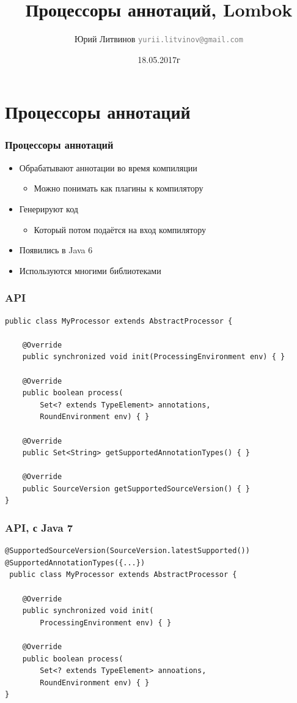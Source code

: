 \documentclass[xetex,mathserif,serif]{beamer}
\title{Процессоры аннотаций, Lombok}
\author[Юрий Литвинов]{Юрий Литвинов \newline \textcolor{gray}{\small\texttt{yurii.litvinov@gmail.com}}}
\date{18.05.2017г}
\begin{document}
	
	\frame{\titlepage}
	
	\section{Процессоры аннотаций}

	\begin{frame}
		\frametitle{Процессоры аннотаций}
		\begin{itemize}
			\item Обрабатывают аннотации во время компиляции
			\begin{itemize}
				\item Можно понимать как плагины к компилятору
			\end{itemize}
			\item Генерируют код
			\begin{itemize}
				\item Который потом подаётся на вход компилятору
			\end{itemize}
			\item Появились в Java 6
			\item Используются многими библиотеками
		\end{itemize}
	\end{frame}

	\begin{frame}[fragile]
		\frametitle{API}
		\begin{small}
			\begin{verbatim}
public class MyProcessor extends AbstractProcessor {

    @Override
    public synchronized void init(ProcessingEnvironment env) { }

    @Override
    public boolean process(
        Set<? extends TypeElement> annotations, 
        RoundEnvironment env) { }

    @Override
    public Set<String> getSupportedAnnotationTypes() { }

    @Override
    public SourceVersion getSupportedSourceVersion() { }
}
			\end{verbatim}
		\end{small}
\end{frame}

	\begin{frame}[fragile]
		\frametitle{API, с Java 7}
		\begin{small}
			\begin{verbatim}
@SupportedSourceVersion(SourceVersion.latestSupported())
@SupportedAnnotationTypes({...})
 public class MyProcessor extends AbstractProcessor {

    @Override
    public synchronized void init(
        ProcessingEnvironment env) { }

    @Override
    public boolean process(
        Set<? extends TypeElement> annoations, 
        RoundEnvironment env) { }
}
			\end{verbatim}
		\end{small}
\end{frame}
\end{document}
